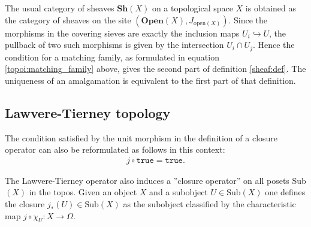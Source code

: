     \begin{example}
        The usual category of sheaves $\mathbf{Sh}(X)$ on a topological space $X$ is obtained as the category of sheaves on the site $(\mathbf{Open}(X), J_{\text{open}(X)})$. Since the morphisms in the covering sieves are exactly the inclusion maps $U_i\hookrightarrow U$, the pullback of two such morphisms is given by the intersection $U_i\cap U_j$. Hence the condition for a matching family, as formulated in equation \ref{topoi:matching_family} above, gives the second part of definition \ref{sheaf:def}. The uniqueness of an amalgamation is equivalent to the first part of that definition.
    \end{example}


\subsection{Lawvere-Tierney topology}

    \begin{remark}
        The condition satisfied by the unit morphism in the definition of a closure operator can also be reformulated as follows in this context:
        \begin{gather}
            j\circ\texttt{true} = \texttt{true}.
        \end{gather}
    \end{remark}
    The Lawvere-Tierney operator also induces a ''closure operator'' on all posets Sub$(X)$ in the topos. Given an object $X$ and a subobject $U\in\text{Sub}(X)$ one defines the closure $j_\ast(U)\in\text{Sub}(X)$ as the subobject classified by the characteristic map $j\circ\chi_U:X\rightarrow\Omega$.

